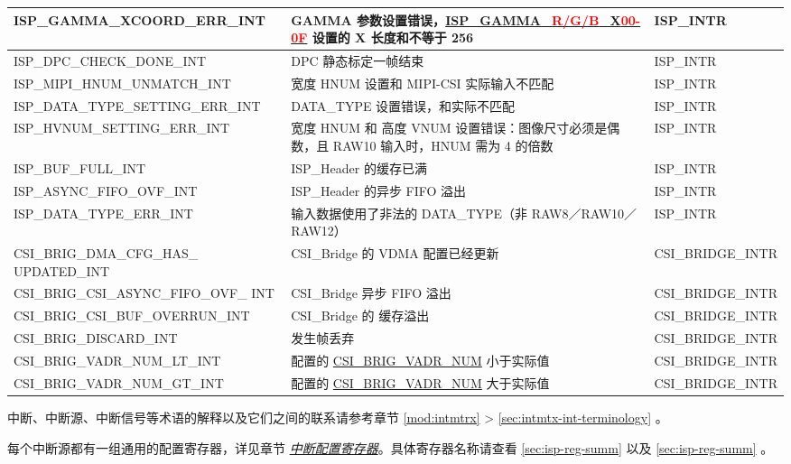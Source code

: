 \documentclass[main\_\_CN.tex]{subfiles}
\begin{document}
\begin{longtable}{ | L{5.6cm} | L{5.8cm} | L{3cm} | }
    ISP\_GAMMA\_XCOORD\_ERR\_INT & GAMMA 参数设置错误，\hyperref[fielddesc:ISPGAMMARX00]{ISP\_GAMMA\_\textcolor{red}{R/G/B}\_X\textcolor{red}{00-0F}} 设置的 X 长度和不等于 256 & ISP\_INTR \\ \hline
    ISP\_DPC\_CHECK\_DONE\_INT & DPC 静态标定一帧结束 & ISP\_INTR \\ \hline
    ISP\_MIPI\_HNUM\_UNMATCH\_INT & 宽度 HNUM 设置和 MIPI-CSI 实际输入不匹配 & ISP\_INTR \\ \hline
    ISP\_DATA\_TYPE\_SETTING\_ERR\_INT & DATA\_TYPE 设置错误，和实际不匹配 & ISP\_INTR \\ \hline
    ISP\_HVNUM\_SETTING\_ERR\_INT & 宽度 HNUM 和 高度 VNUM 设置错误：图像尺寸必须是偶数，且 RAW10 输入时，HNUM 需为 4 的倍数 & ISP\_INTR \\ \hline
    ISP\_BUF\_FULL\_INT & ISP\_Header 的缓存已满 & ISP\_INTR \\ \hline
    ISP\_ASYNC\_FIFO\_OVF\_INT & ISP\_Header 的异步 FIFO 溢出 & ISP\_INTR \\ \hline
    ISP\_DATA\_TYPE\_ERR\_INT & 输入数据使用了非法的 DATA\_TYPE（非 RAW8／RAW10／RAW12） & ISP\_INTR \\ \hline
    CSI\_BRIG\_DMA\_CFG\_HAS\_          UPDATED\_INT & CSI\_Bridge 的 VDMA 配置已经更新  & CSI\_BRIDGE\_INTR \\\hline
    CSI\_BRIG\_CSI\_ASYNC\_FIFO\_OVF\_  INT & CSI\_Bridge 异步 FIFO 溢出 & CSI\_BRIDGE\_INTR \\\hline
    CSI\_BRIG\_CSI\_BUF\_OVERRUN\_INT & CSI\_Bridge 的 缓存溢出 & CSI\_BRIDGE\_INTR \\\hline
    CSI\_BRIG\_DISCARD\_INT & 发生帧丢弃 & CSI\_BRIDGE\_INTR \\\hline
    CSI\_BRIG\_VADR\_NUM\_LT\_INT & 配置的 \hyperref[fielddesc:CSIBRIGVADRNUM]{CSI\_BRIG\_VADR\_NUM} 小于实际值 & CSI\_BRIDGE\_INTR \\\hline
    CSI\_BRIG\_VADR\_NUM\_GT\_INT & 配置的 \hyperref[fielddesc:CSIBRIGVADRNUM]{CSI\_BRIG\_VADR\_NUM} 大于实际值 & CSI\_BRIDGE\_INTR \\\hline
\end{longtable}

\begin{tiplisting}
中断、中断源、中断信号等术语的解释以及它们之间的联系请参考章节 \ref{mod:intmtrx} \textit{} > \ref{sec:intmtx-int-terminology} \textit{}。
\end{tiplisting}


每个中断源都有一组通用的配置寄存器，详见章节 \hyperref[interrupt-config-registers]{\textit{中断配置寄存器}}。具体寄存器名称请查看 \ref{sec:isp-reg-summ} \textit{} 以及 \ref{sec:isp-reg-summ} \textit{}。
\end{document}
